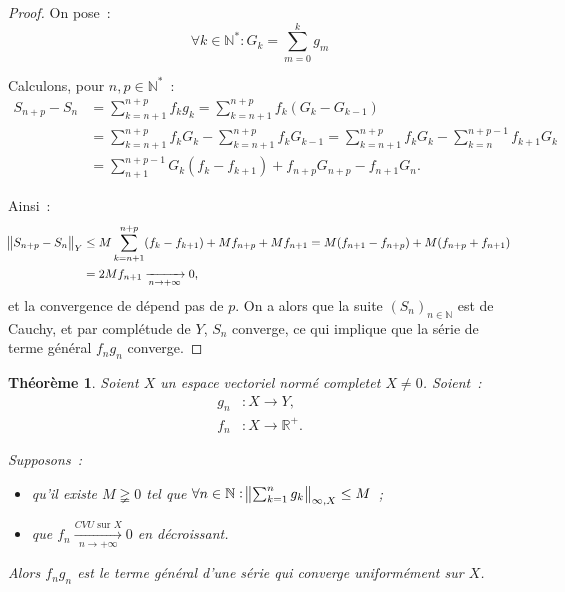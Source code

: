 \documentclass{report}
\newtheorem{thm}{Théorème}[chapter]
\theoremstyle{definition}
\theoremstyle{remark}
\numberwithin{equation}{section}
\newcommand{\R}{\mathbb R}
\newcommand{\Rp}{\R^{+}}
\newcommand{\N}{\mathbb N}
\newcommand{\Ns}{\N^{*}}
\newcommand{\seq}[3]{\left(#1_{#2}\right)_{#2 \in #3}}
\newcommand{\CONV}[5]{\xrightarrow[#2 \to #3]{#4 \text{ #5 } #1}}
\newcommand{\CVU}[3]{\CONV{#1}{#2}{#3}{CVU}{sur}}
\newcommand{\pinfty}{{+\infty}}
\newcommand{\evn}{espace vectoriel normé}
\newcommand{\evnc}{{\evn} complet}
\begin{document}
			\begin{proof} On pose~:
			\begin{equation}
				\forall k \in \Ns : G_k = \sum_{m=0}^kg_m
			\end{equation}

			Calculons, pour $n, p \in \Ns$~:
			\begin{align}
				S_{n+p} - S_n &= \sum_{k=n+1}^{n+p}f_kg_k = \sum_{k=n+1}^{n+p}f_k(G_k - G_{k-1}) \\
				&= \sum_{k=n+1}^{n+p}f_kG_k - \sum_{k=n+1}^{n+p}f_kG_{k-1} = \sum_{k=n+1}^{n+p}f_kG_k - \sum_{k=n}^{n+p-1}f_{k+1}G_k \\
				&= \sum_{n+1}^{n+p-1}G_k(f_k - f_{k+1}) + f_{n+p}G_{n+p} - f_{n+1}G_n.
			\end{align}

			Ainsi~:
			\begin{align}
				\norm {S_{n+p} - S_n}_Y &\leq M\sum_{k=n+1}^{n+p}(f_k-f_{k+1}) + Mf_{n+p} + Mf_{n+1} = M(f_{n+1}-f_{n+p}) + M(f_{n+p} + f_{n+1}) \\
				&= 2Mf_{n+1} \xrightarrow [n \to \pinfty]{} 0,
			\end{align}
			et la convergence de dépend pas de $p$. On a alors que la suite $\seq Sn\N$ est de Cauchy, et par complétude de $Y$, $S_n$ converge, ce qui implique que la
			série de terme général $f_ng_n$ converge.
			\end{proof}

			\begin{thm} Soient $X$ un \evnc et $X \neq 0$. Soient~:
			\begin{align}
				g_n &: X \to Y, \\
				f_n &: X \to \Rp.
			\end{align}

			Supposons~:
			\begin{itemize}
				\item qu'il existe $M \gneqq 0$ tel que $\forall n \in \N : \norm {\sum_{k=1}^ng_k}_{\infty, X} \leq M$~;
				\item que $f_n \CVU Xn\pinfty 0$ en décroissant.
			\end{itemize}

			Alors $f_ng_n$ est le terme général d'une série qui converge uniformément sur $X$.
			\end{thm}
\end{document}
